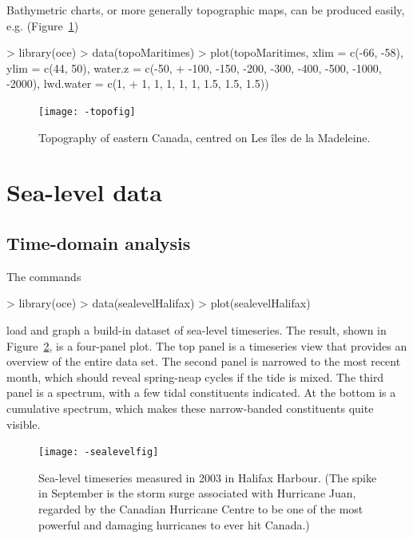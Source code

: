 \documentclass{article}
\begin{document}
Bathymetric charts, or more generally topographic maps, can be produced easily, e.g. (Figure~\ref{fig:topo})
\begin{Schunk}
\begin{Sinput}
> library(oce)
> data(topoMaritimes)
> plot(topoMaritimes, xlim = c(-66, -58), ylim = c(44, 50), water.z = c(-50, 
+     -100, -150, -200, -300, -400, -500, -1000, -2000), lwd.water = c(1, 
+     1, 1, 1, 1, 1, 1.5, 1.5, 1.5))
\end{Sinput}
\end{Schunk}
\begin{figure}
\begin{center}
\texttt{[image: -topofig]}
\end{center}
\caption{Topography of eastern Canada, centred on Les \^{i}les de la Madeleine.}
\label{fig:topo}
\end{figure}

\section{Sea-level data}

\subsection{Time-domain analysis}


The commands
\begin{Schunk}
\begin{Sinput}
> library(oce)
> data(sealevelHalifax)
> plot(sealevelHalifax)
\end{Sinput}
\end{Schunk}
load and graph a build-in dataset of sea-level timeseries. The result, shown in
Figure~\ref{fig:sealevel}, is a four-panel plot. The top panel is a timeseries
view that provides an overview of the entire data set. The second panel is
narrowed to the most recent month, which should reveal spring-neap cycles if the
tide is mixed. The third panel is a spectrum, with a few tidal constituents
indicated. At the bottom is a cumulative spectrum, which makes these
narrow-banded constituents quite visible.

\begin{figure}
\begin{center}
\texttt{[image: -sealevelfig]}
\end{center}
\caption{Sea-level timeseries measured in 2003 in Halifax Harbour.  (The spike
in September is the storm surge associated with Hurricane Juan, regarded by the
Canadian Hurricane Centre to be one of the most powerful and damaging hurricanes
to ever hit Canada.)}
\label{fig:sealevel}
\end{figure}
\end{document}
